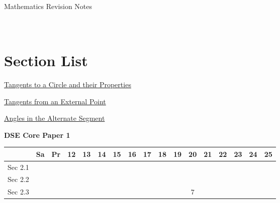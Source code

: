 \documentclass[12pt, a4paper]{article}
\begin{document}
\newpage
\newpage
\thispagestyle{empty}
\begin{center}
Mathematics Revision Notes\\\vspace{1cm}
\\\vspace{1cm}
{\fontsize{24pt}{24pt}\selectfont {Tangents to Circles \NF}} \\\vspace{1cm}
\label{chapter:S5-2}

\end{center}
\vspace{0.5cm}
\hline
\section*{Section List}
\begin{enumx}[label=Sec 2.\arabic*\ ]
\item \hyperref[section:5-2-1]{Tangents to a Circle and their Properties \NF}
\item \hyperref[section:5-2-2]{Tangents from an External Point \NF}
\item \hyperref[section:5-2-3]{Angles in the Alternate Segment \NF}
\end{enumx}
\begin{absolutelynopagebreak}
\begin{center}
\textbf{DSE Core Paper 1}
\end{center}
\begin{center}
\begin{tabular}{|l|c|c|c|c|c|c|c|c|c|c|c|c|c|c|c|c|}
\hline
        & Sa & Pr & 12 & 13 & 14 & 15 & 16 & 17 & 18 & 19 & 20 & 21 & 22 & 23 & 24 & 25 \\\hline\hline
Sec 2.1 &  &  &  &  &  &  &  &  &  &  &  &  &  &  &  &  \\\hline
Sec 2.2 &  &  &  &  &  &  &  &  &  &  &  &  &  &  &  &  \\\hline
Sec 2.3 &  &  &  &  &  &  &  &  &  &  &  $7$ &  &  &  &  &  \\\hline
\end{tabular}
\end{center}
\end{absolutelynopagebreak}
\end{document}

